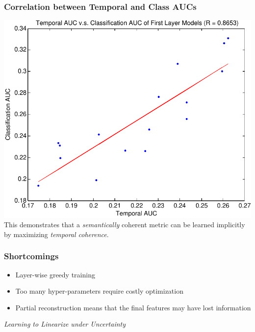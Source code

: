 \documentclass{beamer}
\begin{document}
\begin{frame}
\frametitle{Correlation between Temporal and Class AUCs}
\centering
\includegraphics[scale=0.5]{./Figures/Project1/scatter-crop.pdf}\\
This demonstrates that a \emph{semantically} coherent metric can be learned implicitly by maximizing \emph{temporal coherence}.  
\end{frame} 

\begin{frame}
\frametitle{Shortcomings}
\begin{itemize}
\item{Layer-wise greedy training} 
\item{Too many hyper-parameters require costly optimization} 
\item{Partial reconstruction means that the final features may have lost information}
\end{itemize} 
\end{frame} 

\begin{frame}
\begin{center} 
\huge \color{blue} \emph{Learning to Linearize under Uncertainty}
\end{center} 
\end{frame}
\end{document}
